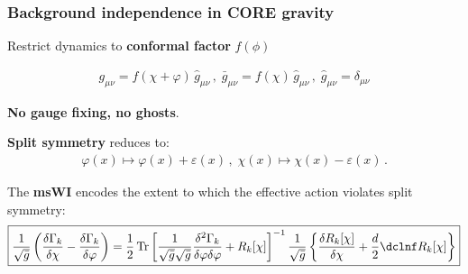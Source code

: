 \documentclass[]{beamer}  %
\begin{document}
\begin{frame}[t]
  \frametitle{Background independence in CORE gravity}
  \vspace{3mm}

  Restrict dynamics to \textbf{conformal factor} $f(\phi)$

  \begin{align*}
      g_{\mu\nu} = f(\chi + \varphi ) \, \hat g_{\mu\nu} \,, \;
      \bar g_{\mu\nu} = f(\chi) \, \hat g_{\mu\nu} \,, \;
      \hat g_{\mu\nu} = \delta_{\mu\nu}
  \end{align*}

  \textbf{No gauge fixing, no ghosts}.

  \vspace{25pt}
  \textbf{Split symmetry} reduces to:
  \begin{align*}
    \boxed{
      \varphi(x) \mapsto \varphi(x) + \varepsilon(x) \,, \; \chi(x) \mapsto \chi(x) - \varepsilon(x)\,.
    }
  \end{align*}

  \vspace{25pt}
  The \textbf{msWI} encodes the extent to which the effective action violates split symmetry:
  \footnotesize
  \begin{align*}
    \boxed{
      \frac{1}{\sqrt{\bar g}}\left(\frac{\delta\Gamma_k}{\delta \chi}
      -\frac{\delta \Gamma_k}{\delta \varphi}\right)
      = \frac{1}{2} \,
      \mathrm{Tr}\left[\frac{1}{\sqrt{\bar g}\sqrt{\bar g}}\frac{\delta^2\Gamma_k}
      {\delta \varphi \delta \varphi}+ R_k[\chi]\right]^{-1} \frac{1}{\sqrt{\bar g}}
      \left\{\frac{\delta R_k[\chi] }{\delta \chi}+\frac{d}{2}\dclnf R_k[\chi]\right\}
    }
  \end{align*}
\end{frame}


\end{document}
